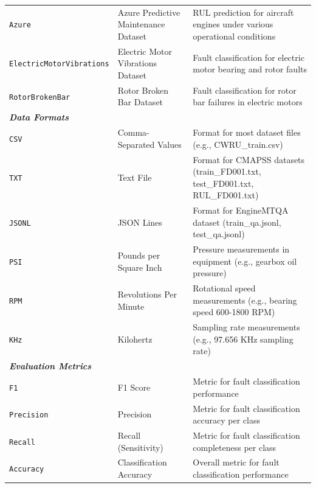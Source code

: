 \begin{table}[ht]
\begin{tabular}{@{}lll@{}}
\texttt{Azure} & Azure Predictive Maintenance Dataset & RUL prediction for aircraft engines under various operational conditions \\
\texttt{ElectricMotorVibrations} & Electric Motor Vibrations Dataset & Fault classification for electric motor bearing and rotor faults \\
\texttt{RotorBrokenBar} & Rotor Broken Bar Dataset & Fault classification for rotor bar failures in electric motors \\
\midrule
\multicolumn{3}{l}{\textbf{\textit{Data Formats}}} \\
\texttt{CSV} & Comma-Separated Values & Format for most dataset files (e.g., CWRU\_train.csv) \\
\texttt{TXT} & Text File & Format for CMAPSS datasets (train\_FD001.txt, test\_FD001.txt, RUL\_FD001.txt) \\
\texttt{JSONL} & JSON Lines & Format for EngineMTQA dataset (train\_qa.jsonl, test\_qa.jsonl) \\
\texttt{PSI} & Pounds per Square Inch & Pressure measurements in equipment (e.g., gearbox oil pressure) \\
\texttt{RPM} & Revolutions Per Minute & Rotational speed measurements (e.g., bearing speed 600-1800 RPM) \\
\texttt{KHz} & Kilohertz & Sampling rate measurements (e.g., 97.656 KHz sampling rate) \\
\midrule
\multicolumn{3}{l}{\textbf{\textit{Evaluation Metrics}}} \\
\texttt{F1} & F1 Score & Metric for fault classification performance \\
\texttt{Precision} & Precision & Metric for fault classification accuracy per class \\
\texttt{Recall} & Recall (Sensitivity) & Metric for fault classification completeness per class \\
\texttt{Accuracy} & Classification Accuracy & Overall metric for fault classification performance \\
\bottomrule
\end{tabular}
\end{table}